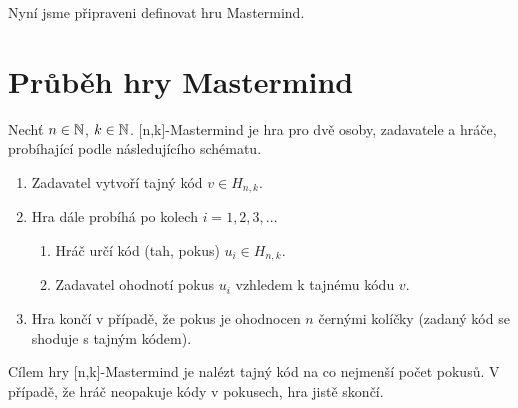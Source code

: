
Nyní jsme připraveni definovat hru Mastermind. 

\section{Průběh hry Mastermind}
Nechť $n \in \mathbb{N} $, $k \in \mathbb{N}$. [n,k]-Mastermind je hra pro dvě osoby, zadavatele a hráče, 
probíhající podle následujícího schématu. 
\begin{enumerate}
    \item Zadavatel vytvoří tajný kód $v \in H_{n,k}$.
    \item Hra dále probíhá po kolech $i = 1,2,3,\dots$
        \begin{enumerate}
            \item Hráč určí kód (tah, pokus) $u_i \in H_{n,k}$.
            \item Zadavatel ohodnotí pokus $u_i$ vzhledem k tajnému kódu $v$. 
        \end{enumerate}
    \item Hra končí v případě, že pokus je ohodnocen $n$ černými kolíčky (zadaný kód se shoduje s tajným kódem). 
\end{enumerate}
Cílem hry [n,k]-Mastermind je nalézt tajný kód na co nejmenší počet pokusů. V případě, že hráč neopakuje kódy v pokusech, hra jistě skončí.





